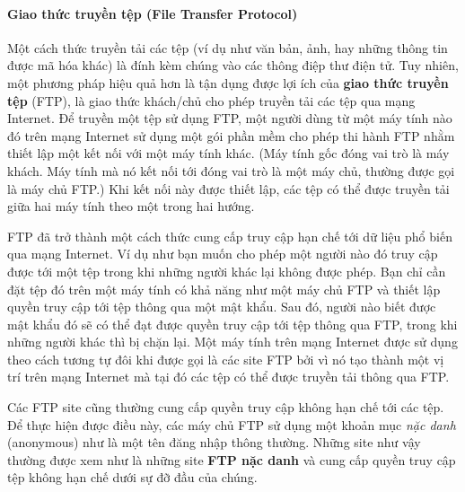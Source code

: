 \paragraph{Giao thức truyền tệp (File Transfer Protocol)} Một cách thức truyền tải các tệp
(ví dụ như văn bản, ảnh, hay những thông tin được mã hóa khác) là đính kèm chúng vào các
thông điệp thư điện tử. Tuy nhiên, một phương pháp hiệu quả hơn là tận dụng được lợi ích
của\textbf{ giao thức truyền tệp} (FTP), là giao thức khách/chủ cho phép truyền tải các
tệp qua mạng Internet. Để truyền một tệp sử dụng FTP, một người dùng từ một máy tính nào
đó trên mạng Internet sử dụng một gói phần mềm cho phép thi hành FTP nhằm thiết lập một
kết nối với một máy tính khác. (Máy tính gốc đóng vai trò là máy khách. Máy tính mà nó kết
nối tới đóng vai trò là một máy chủ, thường được gọi là máy chủ FTP.)  Khi kết nối này
được thiết lập, các tệp có thể được truyền tải giữa hai máy tính theo một trong hai hướng.

FTP đã trở thành một cách thức cung cấp truy cập hạn chế tới dữ liệu phổ biến qua mạng
Internet. Ví dụ như bạn muốn cho phép một người nào đó truy cập được tới một tệp trong khi
những người khác lại không được phép. Bạn chỉ cần đặt tệp đó trên một máy tính có khả năng
như một máy chủ FTP và thiết lập quyền truy cập tới tệp thông qua một mật khẩu. Sau đó,
người nào biết được mật khẩu đó sẽ có thể đạt được quyền truy cập tới tệp thông qua FTP,
trong khi những người khác thì bị chặn lại. Một máy tính trên mạng Internet được sử dụng
theo cách tương tự đôi khi được gọi là các site FTP bởi vì nó tạo thành một vị trí trên
mạng Internet mà tại đó các tệp có thể được truyền tải thông qua FTP.

Các FTP site cũng thường cung cấp quyền truy cập không hạn chế tới các tệp. Để thực hiện
được điều này, các máy chủ FTP sử dụng một khoản mục \textit{nặc danh} (anonymous) như là
một tên đăng nhập thông thường. Những site như vậy thường được xem như là những site
\textbf{FTP nặc danh} và cung cấp quyền truy cập tệp không hạn chế dưới sự đỡ đầu của
chúng.

